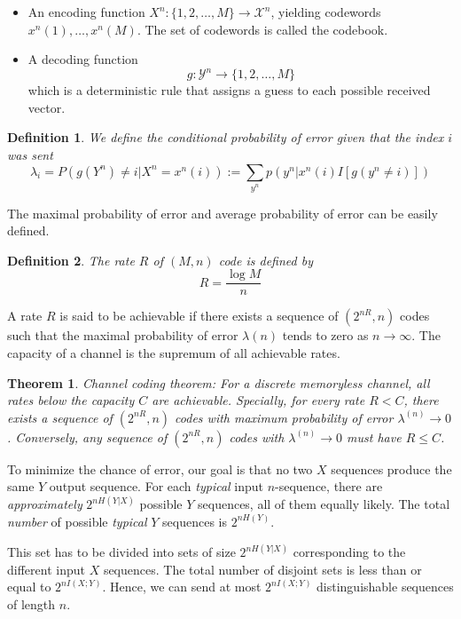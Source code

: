 \documentclass[10pt,landscape, a4paper]{article}
\newtheorem{definition}{Definition}
\newtheorem{theorem}{Theorem}
\begin{document}
\begin{multicols}{3}
\begin{itemize}
    \item An encoding function $X^n:\{1,2,\dots, M\}\rightarrow \mathcal{X}^n$, yielding codewords $x^n(1),\dots, x^n(M)$. The set of codewords is called the codebook.
    
    \item A decoding function
      $$
      g: \mathcal{Y}^n\rightarrow \{1,2,\dots, M\}
      $$
      which is a deterministic rule that assigns a guess to each possible received vector.
\end{itemize}

\begin{definition}
    We define the conditional probability of error given that the index $i$ was sent
    $$
    \lambda_i=P(g(Y^n)\ne i|X^n=x^n(i)):=\sum_{y^n}p(y^n|x^n(i)I[g(y^n\ne i)])
    $$
\end{definition}
The maximal probability of error and average probability of error can be easily defined.

\begin{definition}
    The rate $R$ of $(M,n)$ code is defined by
    $$
    R=\frac{\log M}{n}
    $$
\end{definition}
A rate $R$ is said to be achievable if there exists a sequence of $(2^{nR},n)$ codes such that the maximal probability of error $\lambda(n)$ tends to zero as $n\rightarrow \infty$. The capacity of a channel is the supremum of all achievable rates.

\begin{theorem}
    Channel coding theorem: For a discrete memoryless channel, all rates below the capacity $C$ are achievable. Specially, for every rate $R<C$, there exists a sequence of $(2^{nR},n)$ codes with maximum probability of error $\lambda^{(n)}\rightarrow 0$. Conversely, any sequence of $(2^{nR}, n)$ codes with $\lambda^{(n)}\rightarrow 0$ must have $R\le C$.
\end{theorem}

To minimize the chance of error, our goal is that no two $X$ sequences produce the same $Y$ output sequence. For each \textit{typical} input $n$-sequence, there are \textit{approximately} $2^{nH(Y|X)}$ possible $Y$ sequences, all of them equally likely. The total \textit{number} of possible \textit{typical} $Y$ sequences is $2^{nH(Y)}$. 

This set has to be divided into sets of size $2^{nH(Y|X)}$ corresponding to the different input $X$ sequences. The total number of disjoint sets is less than or equal to $2^{nI(X;Y)}$. Hence, we can send at most $2^{nI(X;Y)}$ distinguishable sequences of length $n$.


\end{multicols}
\end{document}
